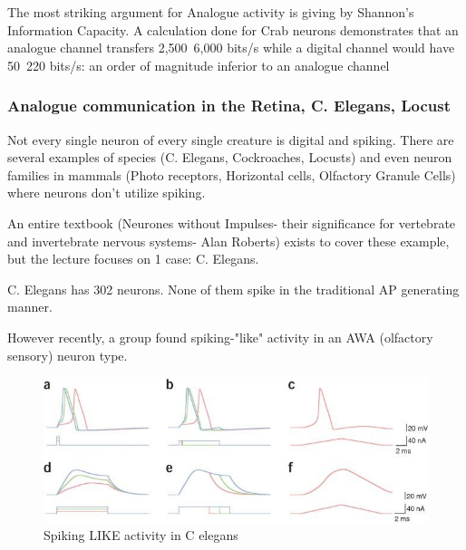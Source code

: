 \documentclass[main]{subfiles}
\begin{document}
The most striking argument for Analogue activity is giving by Shannon's Information Capacity.
A calculation done for Crab neurons demonstrates that an analogue channel transfers 2,500~6,000 bits/s while a digital channel would have 50~220 bits/s: an order of magnitude inferior to an analogue channel


\subsubsection{Analogue communication in the Retina, C. Elegans, Locust}

Not every single neuron of every single creature is digital and spiking. There are several examples of species (C. Elegans, Cockroaches, Locusts) and even neuron families in mammals (Photo receptors, Horizontal cells, Olfactory Granule Cells) where neurons don't utilize spiking. 

An entire textbook (Neurones without Impulses- their significance for vertebrate and invertebrate nervous systems- Alan Roberts) exists to cover these example, but the lecture focuses on 1 case: C. Elegans.

C. Elegans has 302 neurons. None of them spike in the traditional AP generating manner. 

However recently, a group found spiking-"like" activity in an AWA (olfactory sensory) neuron type.


\begin{figure}[H]
	\centering
	\includegraphics[width=0.9\linewidth]{09_WhySpikes/figures/celegans.jpg}
	\caption{Spiking LIKE activity in C elegans}
\end{figure}
\end{document}

